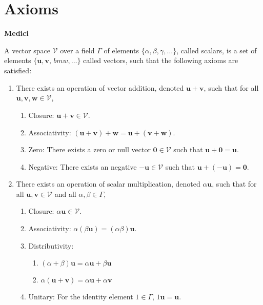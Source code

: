 \documentclass{article}
\begin{document}
    \section{Axioms}
    \begin{minipage}[t]{.45\textwidth} %
        \begin{center}
            \textbf{Medici}
        \end{center}
            A vector space $\mathcal{V}$ over a field $\Gamma$ of elements $\{\alpha, \beta, \gamma, \dots\}$, called scalars, is a set of elements $\{\bm{u},\bm{v},\frac{}{}bm{w},\dots\}$ called vectors, such that the following axioms are satisfied:
            \vspace{2mm}
            \begin{enumerate}
                \item There exists an operation of vector addition, denoted $\bm{u}+\bm{v}$, such that for all $\bm{u},\bm{v},\bm{w} \in \mathcal{V}$,
                \vspace{2mm}
                \begin{enumerate}[label=\textbf{A\Roman*.}]
                    \item Closure: $\bm{u}+\bm{v} \in \mathcal{V}$.
                    \item Associativity: $(\bm{u} + \bm{v}) + \bm{w} = \bm{u} + (\bm{v}+\bm{w})$.
                    \item Zero: There exists a zero or null vector $\bm{0} \in \mathcal{V}$ such that $\bm{u}+\bm{0}=\bm{u}$.
                    \item Negative: There exists an negative $\bm{-u} \in \mathcal{V}$ such that $\bm{u}+(\bm{-u}) = \bm{0}$.
                \end{enumerate}
                \item There exists an operation of scalar multiplication, denoted $\alpha\bm{u}$, such that for all $\bm{u},\bm{v} \in \mathcal{V}$ and all $\alpha, \beta \in \Gamma$,
                \vspace{2mm}
                \begin{enumerate}[label=\textbf{M\Roman*.}]
                    \item Closure: $\alpha\bm{u} \in \mathcal{V}$.
                    \item Associativity: $\alpha(\beta \bm{u}) = (\alpha \beta)\bm{u}$.
                    \item Distributivity:
                    \begin{enumerate}[label=(\alph*)]
                        \item $(\alpha+\beta)\bm{u} = \alpha\bm{u} + \beta\bm{u}$
                        \item $\alpha(\bm{u}+\bm{v}) = \alpha\bm{u}+\alpha\bm{v}$
                    \end{enumerate}
                    \item Unitary: For the identity element $1 \in \Gamma$, $1\bm{u}=\bm{u}$.
                \end{enumerate}
            \end{enumerate}
    \end{minipage} %
\end{document}
